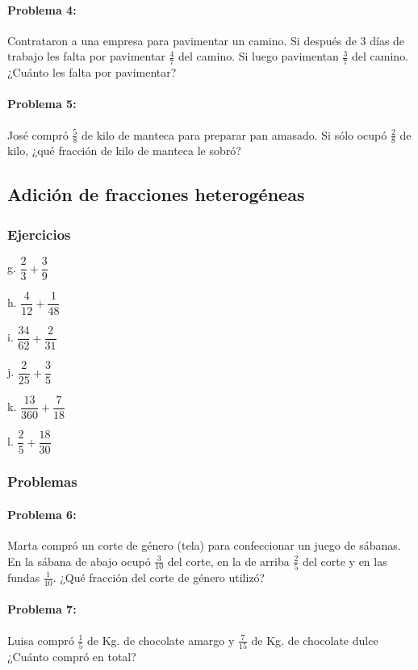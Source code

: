 \documentclass[10pt,twoside]{article}
\begin{document}
\paragraph*{Problema 4:} Contrataron a una empresa para pavimentar un camino. Si después de 3 días de trabajo les falta por pavimentar $\frac{4}{7}$ del camino. Si luego pavimentan $\frac{3}{7}$ del camino. ¿Cuánto les falta por pavimentar?
\paragraph*{Problema 5:} José compró $\frac{5}{8}$ de kilo de manteca para preparar pan amasado. Si sólo ocupó $\frac{2}{8}$ de kilo, ¿qué fracción de kilo de manteca le sobró?
\subsection*{Adici\'{o}n de fracciones heterog\'{e}neas}
\subsubsection*{Ejercicios}
\begin{enumerate}
\begin{multicols}{3}
\item[g.] $\dfrac{2}{3}+\dfrac{3}{9}$
\item[h.] $\dfrac{4}{12}+\dfrac{1}{48}$
\item[i.] $\dfrac{34}{62}+\dfrac{2}{31}$
\item[j.] $\dfrac{2}{25}+\dfrac{3}{5}$
\item[k.] $\dfrac{13}{360}+\dfrac{7}{18}$
\item[l.] $\dfrac{2}{5}+\dfrac{18}{30}$
\end{multicols}
\end{enumerate}
\subsubsection*{Problemas}
\paragraph*{Problema 6:} Marta compró un corte de género (tela) para confeccionar un juego de sábanas. En la sábana de abajo ocupó $\frac{3}{10}$ del corte, en la de arriba $\frac{2}{5}$ del corte y en las fundas $\frac{1}{10}$. ¿Qué fracción del corte de género utilizó?
\paragraph*{Problema 7:} Luisa compró $\frac{1}{5}$ de Kg. de chocolate amargo y $\frac{7}{15}$ de Kg. de chocolate dulce ¿Cuánto compró en total?
\end{document}
